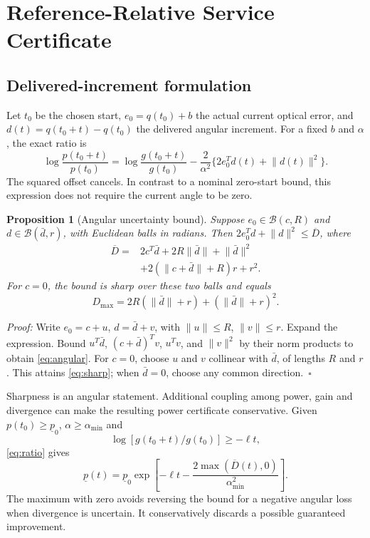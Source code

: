 \documentclass[10pt,journal]{IEEEtran}
\newtheorem{proposition}{Proposition}
\newcommand{\norm}[1]{\lVert#1\rVert}
\begin{document}
\section{Reference-Relative Service Certificate}
\subsection{Delivered-increment formulation}
Let $t_0$ be the chosen start, $e_0=q(t_0)+b$ the actual current optical error, and $d(t)=q(t_0+t)-q(t_0)$ the delivered angular increment. For a fixed $b$ and $\alpha$, the exact ratio is
\begin{equation}
 \log\frac{p(t_0+t)}{p(t_0)}=
 \log\frac{g(t_0+t)}{g(t_0)}-
 \frac{2}{\alpha^2}\{2e_0^Td(t)+\norm{d(t)}^2\}.
 \label{eq:ratio}
\end{equation}
The squared offset cancels. In contrast to a nominal zero-start bound, this expression does not require the current angle to be zero.

\begin{proposition}[Angular uncertainty bound]
Suppose $e_0\in\mathcal B(c,R)$ and $d\in\mathcal B(\bar d,r)$, with Euclidean balls in radians. Then $2e_0^Td+\norm d^2\leq\overline D$, where
\begin{align}
 \overline D={}&2c^T\bar d+2R\norm{\bar d}+\norm{\bar d}^2\nonumber\\
 &+2(\norm{c+\bar d}+R)r+r^2.
 \label{eq:angular}
\end{align}
For $c=0$, the bound is sharp over these two balls and equals
\begin{equation}
 D_{\max}=2R(\norm{\bar d}+r)+(\norm{\bar d}+r)^2.
 \label{eq:sharp}
\end{equation}
\end{proposition}
\emph{Proof:} Write $e_0=c+u$, $d=\bar d+v$, with $\norm u\leq R$, $\norm v\leq r$. Expand the expression. Bound $u^T\bar d$, $(c+\bar d)^Tv$, $u^Tv$, and $\norm v^2$ by their norm products to obtain \eqref{eq:angular}. For $c=0$, choose $u$ and $v$ collinear with $\bar d$, of lengths $R$ and $r$. This attains \eqref{eq:sharp}; when $\bar d=0$, choose any common direction.~$\square$

Sharpness is an angular statement. Additional coupling among power, gain and divergence can make the resulting power certificate conservative. Given $p(t_0)\geq\underline p_0$, $\alpha\geq\alpha_{\min}$ and
\begin{equation}
 \log[g(t_0+t)/g(t_0)]\geq-\ell t,
 \label{eq:gaincondition}
\end{equation}
\eqref{eq:ratio} gives
\begin{equation}
 \underline p(t)=\underline p_0
 \exp\!\left[-\ell t-\frac{2\max(\overline D(t),0)}{\alpha_{\min}^2}\right].
 \label{eq:certificate}
\end{equation}
The maximum with zero avoids reversing the bound for a negative angular loss when divergence is uncertain. It conservatively discards a possible guaranteed improvement.
\end{document}
